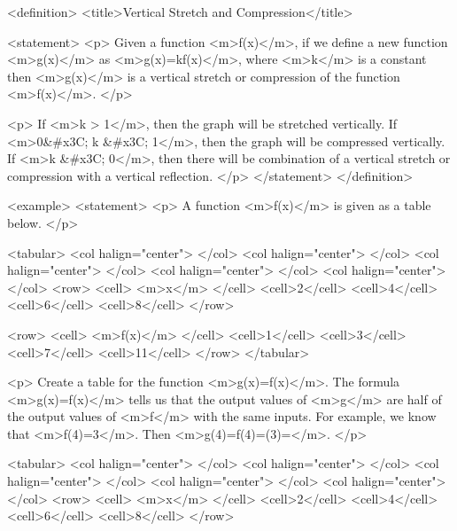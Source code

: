         <definition>
            <title>Vertical Stretch and Compression</title>

            <statement>
                <p>
                    Given a function <m>f(x)</m>, if we define a new function <m>g(x)</m> as <m>g(x)=kf(x)</m>, where <m>k</m> is a constant then <m>g(x)</m> is a vertical stretch or compression of the function <m>f(x)</m>.
                </p>

                <p>
                    If <m>k > 1</m>, then the graph will be stretched vertically.
                    If <m>0&#x3C; k &#x3C; 1</m>, then the graph will be compressed vertically.
                    If <m>k &#x3C; 0</m>, then there will be combination of a vertical stretch or compression with a vertical reflection.
                </p>
            </statement>
        </definition>

        <example>
            <statement>
                <p>
                    A function <m>f(x)</m> is given as a table below.
                </p>

                <tabular>
                    <col halign="center"> </col> <col halign="center"> </col> <col halign="center"> </col> <col halign="center"> </col> <col halign="center"> </col>
                    <row>
                        <cell> <m>x</m> </cell>
                        <cell>2</cell>
                        <cell>4</cell>
                        <cell>6</cell>
                        <cell>8</cell>
                    </row>

                    <row>
                        <cell> <m>f(x)</m> </cell>
                        <cell>1</cell>
                        <cell>3</cell>
                        <cell>7</cell>
                        <cell>11</cell>
                    </row>
                </tabular>

                <p>
                    Create a table for the function <m>g(x)=f(x)</m>.
                    The formula <m>g(x)=f(x)</m> tells us that the output values of <m>g</m> are half of the output values of <m>f</m> with the same inputs.
                    For example, we know that <m>f(4)=3</m>.
                    Then <m>g(4)=f(4)=(3)=</m>.
                </p>

                <tabular>
                    <col halign="center"> </col> <col halign="center"> </col> <col halign="center"> </col> <col halign="center"> </col> <col halign="center"> </col>
                    <row>
                        <cell> <m>x</m> </cell>
                        <cell>2</cell>
                        <cell>4</cell>
                        <cell>6</cell>
                        <cell>8</cell>
                    </row>

